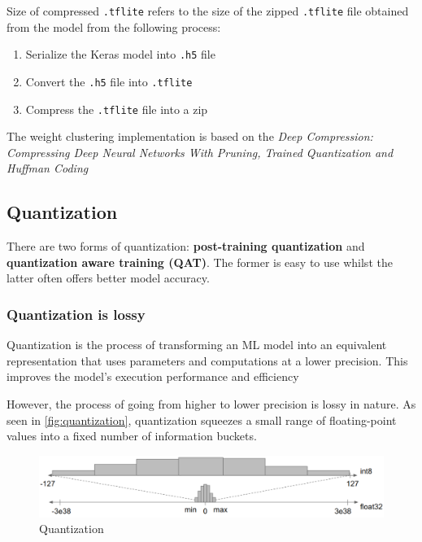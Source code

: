 Size of compressed \texttt{.tflite} refers to the size of the zipped
\texttt{.tflite} file obtained from the model from the following process:

\begin{enumerate}
    \item Serialize the Keras model into \texttt{.h5} file
    \item Convert the \texttt{.h5} file into \texttt{.tflite}
    \item Compress the \texttt{.tflite} file into a zip
\end{enumerate}

The weight clustering implementation is based on the \textit{Deep Compression:
Compressing Deep Neural Networks With Pruning, Trained Quantization and Huffman
Coding}~\cite{han2015deep}~\cite{tfmot:clustering}

\subsection{Quantization}
There are two forms of quantization: \textbf{post-training quantization} and
\textbf{quantization aware training (QAT)}. The former is easy to use whilst
the latter often offers better model accuracy.

\subsubsection{Quantization is lossy}
Quantization is the process of transforming an ML model into an equivalent
representation that uses parameters and computations at a lower precision.
This improves the model's execution performance and efficiency

However, the process of going from higher to lower precision is lossy in
nature. As seen in \autoref{fig:quantization}, quantization squeezes a small
range of floating-point values into a fixed number of information buckets.

\begin{figure}[ht]
    \includegraphics[width=\textwidth]{images/introduction/quantization.png}
    \centering
    \caption{Quantization}\label{fig:quantization}
\end{figure}

